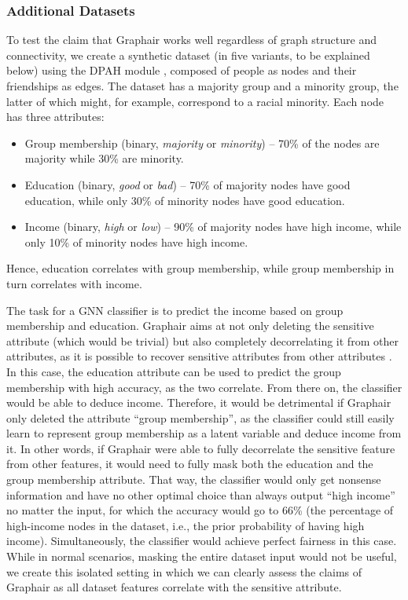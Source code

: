 \subsubsection{Additional Datasets}

To test the claim that Graphair works well regardless of graph structure and connectivity, we create a synthetic dataset (in five variants, to be explained below) using the DPAH module \citep{espin2022inequality}, composed of people as nodes and their friendships as edges. The dataset has a majority group and a minority group, the latter of which might, for example, correspond to a racial minority. Each node has three attributes: 
\begin{itemize}
    \item Group membership (binary, \textit{majority} or \textit{minority}) – 70\% of the nodes are majority while 30\% are minority.
    \item Education (binary, \textit{good} or \textit{bad}) – 70\% of majority nodes have good education, while only 30\% of minority nodes have good education.
    \item Income (binary, \textit{high} or \textit{low}) – 90\% of majority nodes have high income, while only 10\% of minority nodes have high income.
\end{itemize}

Hence, education correlates with group membership, while group membership in turn correlates with income.

The task for a GNN classifier is to predict the income based on group membership and education.
Graphair aims at not only deleting the sensitive attribute (which would be trivial) but also completely decorrelating it from other attributes, as it is possible to recover sensitive attributes from other attributes \citep{sweeney2002k}. 
In this case, the education attribute can be used to predict the group membership with high accuracy, as the two correlate. From there on, the classifier would be able to deduce income. 
Therefore, it would be detrimental if Graphair only deleted the attribute ``group membership'', as the classifier could still easily learn to represent group membership as a latent variable and deduce income from it. 
In other words, if Graphair were able to fully decorrelate the sensitive feature from other features, it would need to fully mask both the education and the group membership attribute. 
That way, the classifier would only get nonsense information and have no other optimal choice than always output “high income” no matter the input, for which the accuracy would go to 66\% (the percentage of high-income nodes in the dataset, i.e., the prior probability of having high income). 
Simultaneously, the classifier would achieve perfect fairness in this case. While in normal scenarios, masking the entire dataset input would not be useful, we create this isolated setting in which we can clearly assess the claims of Graphair as all dataset features correlate with the sensitive attribute.

